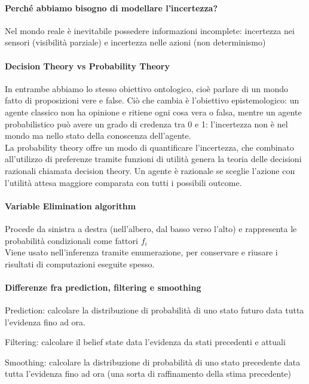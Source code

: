 \documentclass[10pt]{report}
\begin{document}
\paragraph{Perché abbiamo bisogno di modellare l'incertezza?} Nel mondo reale è inevitabile possedere informazioni incomplete: incertezza nei sensori (visibilità parziale) e incertezza nelle azioni (non determinismo)
\paragraph{Decision Theory vs Probability Theory} In entrambe abbiamo lo stesso obiettivo ontologico, cioè parlare di un mondo fatto di proposizioni vere e false. Ciò che cambia è l'obiettivo epistemologico: un agente classico non ha opinione e ritiene ogni cosa vera o falsa, mentre un agente probabilistico può avere un grado di credenza tra 0 e 1: l'incertezza non è nel mondo ma nello stato della conoscenza dell'agente.\\
La probability theory offre un modo di quantificare l'incertezza, che combinato all'utilizzo di preferenze tramite funzioni di utilità genera la teoria delle decisioni razionali chiamata decision theory. Un agente è razionale se sceglie l'azione con l'utilità attesa maggiore comparata con tutti i possibili outcome.
\paragraph{Variable Elimination algorithm} Procede da sinistra a destra (nell'albero, dal basso verso l'alto) e rappresenta le probabilità condizionali come fattori $f_i$\\
Viene usato nell'inferenza tramite enumerazione, per conservare e riusare i risultati di computazioni eseguite spesso.
\paragraph{Differenze fra prediction, filtering e smoothing}
\begin{list}{}{}
	\item Prediction: calcolare la distribuzione di probabilità di uno stato futuro data tutta l'evidenza fino ad ora.
	\item Filtering: calcolare il belief state data l'evidenza da stati precedenti e attuali
	\item Smoothing: calcolare la distribuzione di probabilità di uno stato precedente data tutta l'evidenza fino ad ora (una sorta di raffinamento della stima precedente)
\end{list}
\end{document}
